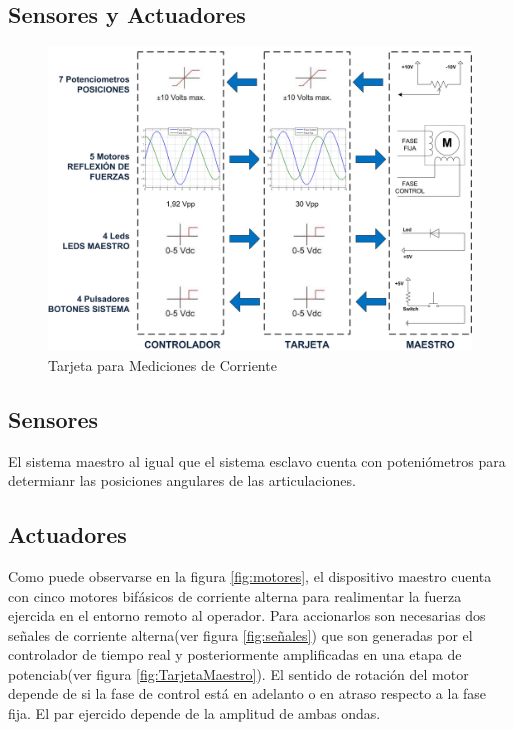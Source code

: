 \newpage
\subsection{Sensores y Actuadores}

\begin{figure}[hbt!]
\centering
\includegraphics[scale=0.2]{FiguresP/EsquemaMaestroCard}
\caption{Tarjeta para Mediciones de Corriente}
\label{fig:TarjetaCorriente}
\end{figure}

\subsection*{Sensores}
El sistema maestro al igual que el sistema esclavo cuenta con poteni\'ometros para determianr las posiciones angulares de las articulaciones.




\subsection*{Actuadores}
Como puede observarse en la figura \ref{fig:motores}, el dispositivo maestro cuenta con cinco motores bif\'asicos de corriente alterna para realimentar la fuerza ejercida en el entorno remoto al operador. Para accionarlos son necesarias dos señales de corriente alterna(ver figura \ref{fig:señales}) que son generadas por el controlador de tiempo real y posteriormente amplificadas en una etapa de potenciab(ver figura \ref{fig:TarjetaMaestro}).  El sentido de rotación del motor depende de si la fase de control est\'a en adelanto o en atraso respecto a la fase fija. El par ejercido depende de la amplitud de ambas ondas.


